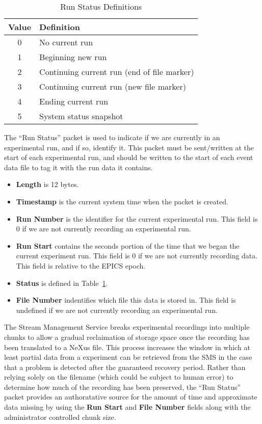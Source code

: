 \begin{table}[h]
  \begin{center}
    \begin{tabular}{c | l}
	Value & Definition \\
	\hline
	0 & No current run \\
	1 & Beginning new run \\
	2 & Continuing current run (end of file marker) \\
	3 & Continuing current run (new file marker) \\
	4 & Ending current run \\
	5 & System status snapshot \\
    \end{tabular}
  \end{center}
  \caption {Run Status Definitions}
  \label{table:protocol_run_status_values}
\end{table}

The ``Run Status'' packet is used to indicate if we are currently in an
experimental run, and if so, identify it. This packet must be sent/written at
the start of each experimental run, and should be written to the start of
each event data file to tag it with the run data it contains.

\begin{itemize}
\item{\bf Length} is 12 bytes.
\item{\bf Timestamp} is the current system time when the packet is created.
\item{\bf Run Number} is the identifier for the current experimental run. This
field is 0 if we are not currently recording an experimental run.
\item{\bf Run Start} contains the seconds portion of the time that we began
the current experiment run. This field is 0 if we are not currently recording
data. This field is relative to the EPICS epoch.
\item{\bf Status} is defined in Table~\ref{table:protocol_run_status_values}.
\item{\bf File Number} indentifies which file this data is stored in. This
field is undefined if we are not currently recording an experimental run.
\end{itemize}

The Stream Management Service breaks experimental recordings into multiple
chunks to allow a gradual reclaimation of storage space once the recording
has been translated to a NeXus file. This process increases the window in
which at least partial data from a experiment can be retrieved from the SMS
in the case that a problem is detected after the guaranteed recovery period.
Rather than relying solely on the filename (which could be subject to human
error) to determine how much of the recording has been preserved, the
``Run Status'' packet provides an authoratative source for the amount
of time and approximate data missing by using the {\bf Run Start} and
{\bf File Number} fields along with the administrator controlled chunk size.

